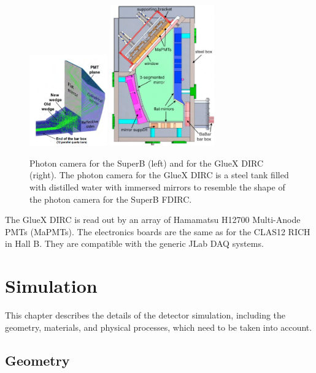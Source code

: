 \documentclass[11pt, a4paper]{article}
\begin{document}
\begin{figure}[!h]
\begin{center}
\includegraphics[width=0.3\textwidth]{pics/superB.png} \hspace{0.5cm} \includegraphics[width=0.4\textwidth]{pics/pc.png}
\end{center}
\caption{\label{pic:ob} Photon camera for the SuperB (left) and for the GlueX DIRC (right). The photon camera for the GlueX DIRC is a steel tank filled with distilled water with immersed mirrors to resemble the shape of the photon camera for the SuperB FDIRC.}
\end{figure}

The GlueX DIRC is read out by an array of Hamamatsu H12700 Multi-Anode PMTs (MaPMTs). The electronics boards are the same as for the CLAS12 RICH in Hall B. They are compatible with the generic JLab DAQ systems.

\section{Simulation}
\label{sec:sim}

This chapter describes the details of the detector simulation, including the geometry, materials, and physical processes, which need to be taken into account. 

\subsection{Geometry}
\end{document}
